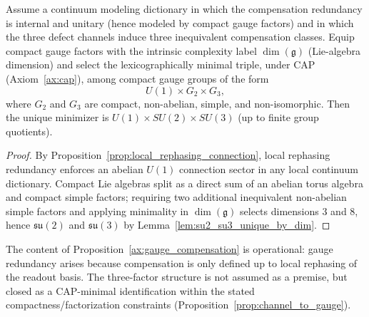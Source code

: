 \begin{proposition}\label{prop:channel_to_gauge}
Assume a continuum modeling dictionary in which the compensation redundancy is internal and unitary (hence modeled by compact gauge factors) and in which the three defect channels induce three inequivalent compensation classes.
Equip compact gauge factors with the intrinsic complexity label $\dim(\mathfrak{g})$ (Lie-algebra dimension) and select the lexicographically minimal triple, under CAP (Axiom~\ref{ax:cap}), among compact gauge groups of the form
\[
U(1)\times G_2\times G_3,
\]
where $G_2$ and $G_3$ are compact, non-abelian, simple, and non-isomorphic.
Then the unique minimizer is $U(1)\times SU(2)\times SU(3)$ (up to finite group quotients).
\end{proposition}
\begin{proof}
By Proposition~\ref{prop:local_rephasing_connection}, local rephasing redundancy enforces an abelian $U(1)$ connection sector in any local continuum dictionary.
Compact Lie algebras split as a direct sum of an abelian torus algebra and compact simple factors; requiring two additional inequivalent non-abelian simple factors and applying minimality in $\dim(\mathfrak{g})$ selects dimensions $3$ and $8$, hence $\mathfrak{su}(2)$ and $\mathfrak{su}(3)$ by Lemma~\ref{lem:su2_su3_unique_by_dim}.
\end{proof}

The content of Proposition~\ref{ax:gauge_compensation} is operational: gauge redundancy arises because compensation is only defined up to local rephasing of the readout basis.
The three-factor structure is not assumed as a premise, but closed as a CAP-minimal identification within the stated compactness/factorization constraints (Proposition~\ref{prop:channel_to_gauge}).

